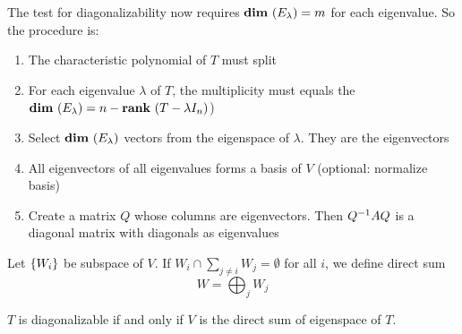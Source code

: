 The test for diagonalizability now requires $\dimension{E_\lambda} = m$ for each eigenvalue. So the procedure is:
\begin{enumerate}
    \item The characteristic polynomial of $T$ must split
    \item For each eigenvalue $\lambda$ of $T$, the multiplicity must equals the $\dimension{E_\lambda} = n - \rank{T - \lambda I_n}$)
    \item Select $\dimension{E_\lambda}$ vectors from the eigenspace of $\lambda$. They are the eigenvectors
    \item All eigenvectors of all eigenvalues forms a basis of $V$ (optional: normalize basis)
    \item Create a matrix $Q$ whose columns are eigenvectors. Then ${Q}^{-1} A Q$ is a diagonal matrix with diagonals as eigenvalues
\end{enumerate}

\begin{definition}
    Let $\set{W_i}$ be subspace of $V$. If $\displaystyle W_i \cap \sum_{j \neq i} W_j = \emptyset$ for all $i$, we define direct sum
    \begin{equation}
        W = \bigoplus_{j} W_j
    \end{equation}
\end{definition}

\begin{theorem}
    $T$ is diagonalizable if and only if $V$ is the direct sum of eigenspace of $T$.    
\end{theorem}



